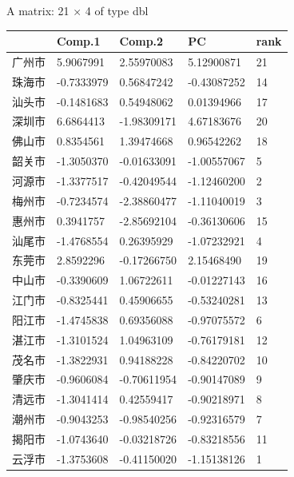 \documentclass[UTF8,a4paper]{ctexart}
\begin{document}
    
    A matrix: 21 × 4 of type dbl
\begin{tabular}{r|llll}
  & Comp.1 & Comp.2 & PC & rank\\
\hline
	广州市 &  5.9067991 &  2.55970083 &  5.12900871 & 21\\
	珠海市 & -0.7333979 &  0.56847242 & -0.43087252 & 14\\
	汕头市 & -0.1481683 &  0.54948062 &  0.01394966 & 17\\
	深圳市 &  6.6864413 & -1.98309171 &  4.67183676 & 20\\
	佛山市 &  0.8354561 &  1.39474668 &  0.96542262 & 18\\
	韶关市 & -1.3050370 & -0.01633091 & -1.00557067 &  5\\
	河源市 & -1.3377517 & -0.42049544 & -1.12460200 &  2\\
	梅州市 & -0.7234574 & -2.38860477 & -1.11040019 &  3\\
	惠州市 &  0.3941757 & -2.85692104 & -0.36130606 & 15\\
	汕尾市 & -1.4768554 &  0.26395929 & -1.07232921 &  4\\
	东莞市 &  2.8592296 & -0.17266750 &  2.15468490 & 19\\
	中山市 & -0.3390609 &  1.06722611 & -0.01227143 & 16\\
	江门市 & -0.8325441 &  0.45906655 & -0.53240281 & 13\\
	阳江市 & -1.4745838 &  0.69356088 & -0.97075572 &  6\\
	湛江市 & -1.3101524 &  1.04963109 & -0.76179181 & 12\\
	茂名市 & -1.3822931 &  0.94188228 & -0.84220702 & 10\\
	肇庆市 & -0.9606084 & -0.70611954 & -0.90147089 &  9\\
	清远市 & -1.3041414 &  0.42559417 & -0.90218971 &  8\\
	潮州市 & -0.9043253 & -0.98540256 & -0.92316579 &  7\\
	揭阳市 & -1.0743640 & -0.03218726 & -0.83218556 & 11\\
	云浮市 & -1.3753608 & -0.41150020 & -1.15138126 &  1\\
\end{tabular}


    
    \begin{center}
    \end{center}
    { \hspace*{\fill} \\}
    
\end{document}
